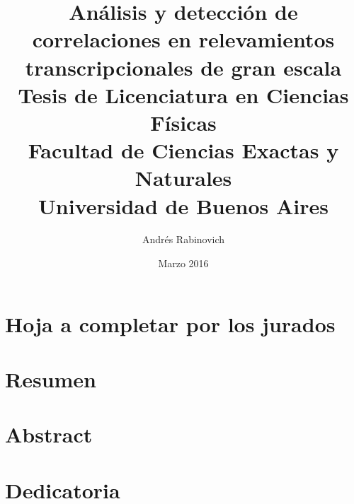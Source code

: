 \documentclass[12pt]{report}
\title{
	{\large Análisis y detección de correlaciones en relevamientos transcripcionales de gran escala}\\
    {Tesis de Licenciatura en Ciencias Físicas}\\
	{\large Facultad de Ciencias Exactas y Naturales}\\
	{\large Universidad de Buenos Aires}
}
\author{Andrés Rabinovich}
\date{Marzo 2016}
\newcommand{\paginaenblanco}{\clearpage\mbox{}\newpage}
\begin{document}
\maketitle
\paginaenblanco
\chapter*{Hoja a completar por los jurados}
\paginaenblanco
\chapter*{Resumen}
\paginaenblanco
\chapter*{Abstract}
\paginaenblanco
\chapter*{Dedicatoria}
\paginaenblanco

\tableofcontents









\clearpage


\end{document}
